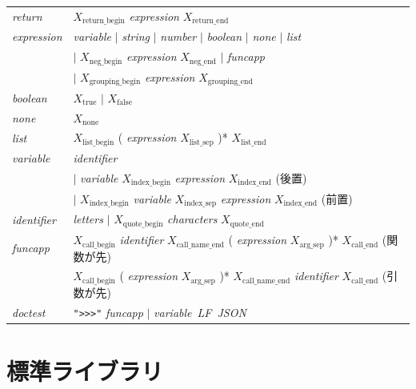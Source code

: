 \documentclass{ipsjprosym}
\begin{document}
\begin{table}[t]
\begin{small}
\begin{tabular}{l p{8cm}}
\textit{return}      & $X_{\mathrm{return\_begin}}$ \textit{expression} $X_{\mathrm{return\_end}}$ \\
\textit{expression}  & \textit{variable} $\mid$ \textit{string} $\mid$ \textit{number} $\mid$ \textit{boolean} $\mid$ \textit{none} $\mid$ \textit{list} \\
                     & $\mid$ $X_{\mathrm{neg\_begin}}$ \textit{expression} $X_{\mathrm{neg\_end}}$ $\mid$ \textit{funcapp} \\
                     & $\mid$ $X_{\mathrm{grouping\_begin}}$ \textit{expression} $X_{\mathrm{grouping\_end}}$ \\
\textit{boolean}     & $X_{\mathrm{true}}$ $\mid$ $X_{\mathrm{false}}$ \\
\textit{none}        & $X_{\mathrm{none}}$ \\
\textit{list}        & $X_{\mathrm{list\_begin}}$ ( \textit{expression} $X_{\mathrm{list\_sep}}$ )* $X_{\mathrm{list\_end}}$ \\
\textit{variable}    & \textit{identifier} \\
                     & $\mid$ \textit{variable} $X_{\mathrm{index\_begin}}$ \textit{expression} $X_{\mathrm{index\_end}}$ \quad (後置) \\
                     & $\mid$ $X_{\mathrm{index\_begin}}$ \textit{variable} $X_{\mathrm{index\_sep}}$ \textit{expression} $X_{\mathrm{index\_end}}$ \quad (前置) \\
\textit{identifier}  & \textit{letters} $\mid$ $X_{\mathrm{quote\_begin}}$ \textit{characters} $X_{\mathrm{quote\_end}}$ \\
\textit{funcapp}     & $X_{\mathrm{call\_begin}}$ \textit{identifier} $X_{\mathrm{call\_name\_end}}$ ( \textit{expression} $X_{\mathrm{arg\_sep}}$ )* $X_{\mathrm{call\_end}}$ \quad (関数が先) \\
                     & $X_{\mathrm{call\_begin}}$ ( \textit{expression} $X_{\mathrm{arg\_sep}}$ )* $X_{\mathrm{call\_name\_end}}$ \textit{identifier} $X_{\mathrm{call\_end}}$ \quad (引数が先) \\
\textit{doctest}     & \verb|">>>"| \textit{funcapp} $\mid$ \textit{variable}\ \textit{LF}\ \textit{JSON} \\
\hline
\end{tabular}
\end{small}
\end{table}

\section{標準ライブラリ}
\label{app:stdlib}
\end{document}
